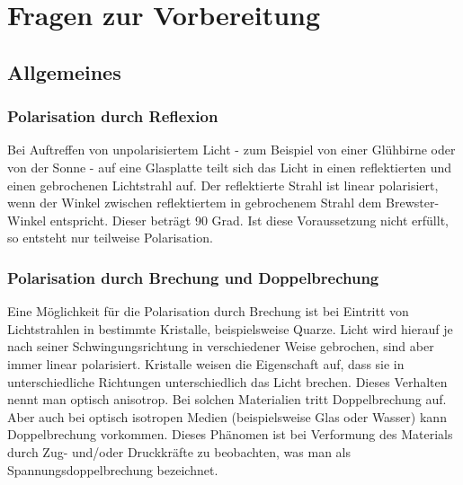 

\chapter{Fragen zur Vorbereitung}
\label{chap:fvz}


\section{Allgemeines}

\subsection*{Polarisation durch Reflexion}
Bei Auftreffen von unpolarisiertem Licht - zum Beispiel von einer Glühbirne oder von der Sonne - auf eine Glasplatte teilt sich das Licht in einen reflektierten und einen gebrochenen Lichtstrahl auf. 
Der reflektierte Strahl ist  linear polarisiert, wenn der Winkel zwischen reflektiertem in gebrochenem Strahl dem Brewster-Winkel entspricht. Dieser beträgt 90 Grad. Ist diese Voraussetzung nicht erfüllt, so entsteht nur teilweise Polarisation. 

\subsection*{Polarisation durch Brechung und Doppelbrechung}
Eine Möglichkeit für die Polarisation durch Brechung ist bei Eintritt von Lichtstrahlen in bestimmte Kristalle, beispielsweise Quarze. Licht wird hierauf je nach seiner Schwingungsrichtung in verschiedener Weise gebrochen, sind aber immer linear polarisiert. 
Kristalle weisen die Eigenschaft auf, dass sie in unterschiedliche Richtungen unterschiedlich das Licht brechen. Dieses Verhalten nennt man optisch anisotrop. Bei solchen Materialien tritt Doppelbrechung auf. Aber auch bei optisch isotropen Medien (beispielsweise Glas oder Wasser) kann Doppelbrechung vorkommen. Dieses Phänomen ist  bei Verformung des Materials durch Zug- und/oder Druckkräfte zu beobachten, was man als Spannungsdoppelbrechung bezeichnet. 

